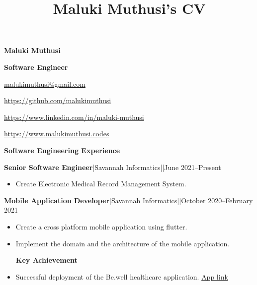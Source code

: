 \documentclass[a4paper]{article}
\begin{document}
\title{Maluki Muthusi's CV}

\begin{center}
    {\Large \textbf{Maluki Muthusi}} \par

    {\large \textbf{Software Engineer}}
\end{center}

\begin{description}[noitemsep]
    \item[\textbf{Email:}] \href{mailto:malukimuthusi@gmail.com}{malukimuthusi@gmail.com}
    \item[\textbf{Github:}] \url{https://github.com/malukimuthusi}
        \item[\textbf{LinkedIn:}]\url{https://www.linkedin.com/in/maluki-muthusi}
        \item[\textbf{Website:}]\url{https://www.malukimuthusi.codes}
\end{description}


\begin{center}
    {\Large \textbf{Software Engineering Experience}}
\end{center}

\textbf{Senior Software Engineer}|Savannah Informatics||June 2021--Present

\begin{itemize}[noitemsep]
    \item Create Electronic Medical Record Management System.
\end{itemize}

\textbf{Mobile Application Developer}|Savannah Informatics||October 2020--February 2021

\begin{itemize}[noitemsep]
    \item Create a cross platform mobile application using flutter.
    \item Implement the domain and the architecture of the mobile application.
          \begin{center}
              \textbf{Key Achievement}
          \end{center}
    \item Successful deployment of the Be.well healthcare application. \href{https://play.google.com/store/apps/details?id=com.savannah.bewell}{App link}
\end{itemize}
\end{document}
